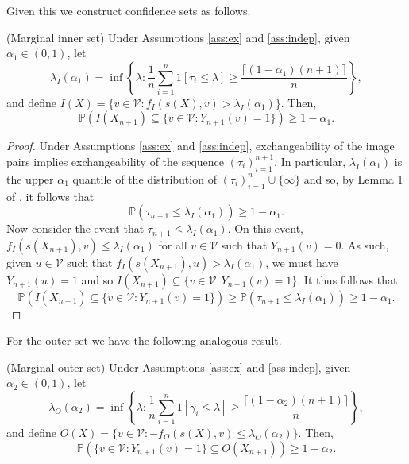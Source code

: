 Given this we construct confidence sets as follows.
\begin{theorem}\label{thm:inner}
	(Marginal inner set)
	Under Assumptions \ref{ass:ex} and \ref{ass:indep}, given $\alpha_1 \in (0,1)$, let 
	\begin{equation*}
		\lambda_I(\alpha_1) = \inf\left\lbrace \lambda: \frac{1}{n} \sum_{i = 1}^n 1\left[ \tau_i\leq \lambda \right] \geq \frac{\lceil (1-\alpha_1)(n+1) \rceil}{n}\right\rbrace,
	\end{equation*}
	and define $I(X) = \lbrace v \in \mathcal{V}: f_I(s(X), v) >\lambda_I(\alpha_1)  \rbrace $. Then,
	\begin{equation}\label{eq:probstat}
		\mathbb{P}\left( I(X_{n+1}) \subseteq\lbrace v\in \mathcal{V}: Y_{n+1}(v) = 1 \rbrace \right) \geq 1 - \alpha_1.
	\end{equation}
\end{theorem}
\begin{proof}
	Under Assumptions \ref{ass:ex} and \ref{ass:indep}, exchangeability of the image pairs implies exchangeability of the sequence $(\tau_i)_{i = 1}^{n+1}$. In particular, $\lambda_I(\alpha_1)$ is the upper $\alpha_1$ quantile of the distribution of $(\tau_i)_{i = 1}^{n} \cup \lbrace \infty \rbrace $ and so, by Lemma 1 of \cite{Tibshirani2019}, it follows that 
	\begin{equation*}
	\mathbb{P}\left(\tau_{n+1} \leq \lambda_I(\alpha_1) \right) \geq 1 - \alpha_1. 
	\end{equation*}
	Now consider the event that $\tau_{n+1}\leq \lambda_I(\alpha_1)$. On this event, $ f_I(s(X_{n+1}),v) \leq \lambda_I(\alpha_1) $
	for all $v \in \mathcal{V}$ such that $Y_{n+1}(v) = 0$. As such, given $u \in \mathcal{V}$ such that $ f_I(s(X_{n+1}), u) > \lambda_I(\alpha_1) $, we must have $Y_{n+1}(u) = 1$ and so $I(X_{n+1}) \subseteq \lbrace v\in \mathcal{V}: Y_{n+1}(v) = 1 \rbrace  $. It thus follows that
	\begin{equation*}
	\mathbb{P}\left( I(X_{n+1}) \subseteq \lbrace v\in \mathcal{V}: Y_{n+1}(v) = 1 \rbrace  \right) \geq \mathbb{P}\left(\tau_{n+1} \leq \lambda_I(\alpha_1) \right) \geq 1 - \alpha_1. 
\end{equation*}
\end{proof}
\noindent For the outer set we have the following analogous result.
\begin{theorem}\label{thm:outer}
	(Marginal outer set)
	Under Assumptions \ref{ass:ex} and \ref{ass:indep}, given $\alpha_2 \in (0,1)$, let 
	\begin{equation*}
		\lambda_O({\alpha_2})= \inf\left\lbrace \lambda: \frac{1}{n} \sum_{i = 1}^n 1\left[ \gamma_i\leq \lambda \right] \geq \frac{\lceil (1-\alpha_2)(n+1) \rceil}{n} \right\rbrace,
	\end{equation*}
	and define $O(X) = \lbrace v \in \mathcal{V}: -f_O(s(X), v) \leq \lambda_O(\alpha_2)  \rbrace $. Then,
	\begin{equation}\label{eq:probstat}
		\mathbb{P}\left( \lbrace v\in \mathcal{V}: Y_{n+1}(v) = 1 \rbrace \subseteq O(X_{n+1}) \right) \geq 1 - \alpha_2.
	\end{equation}
\end{theorem}
